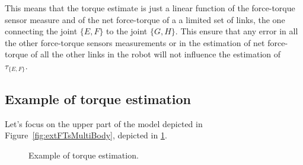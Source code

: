 \begin{remark}
This means that the torque estimate is just a linear function of the force-torque sensor measure and of the net force-torque of a a limited set of links, the one connecting the joint $\{ E,F \}$ to the joint $\{ G, H \}$. This ensure that any error in all the other force-torque sensors measurements or in the estimation of net force-torque of all the other links in the robot will not influence the estimation of $\tau_{\{E,F\}}$. 
\end{remark}

\subsection{Example of torque estimation}
Let's focus on the upper part of the model depicted in Figure~\ref{fig:extFTsMultiBody}, depicted in \ref{fig:local-torque-estimation}. 

\begin{figure}
\centering
{}
\caption{Example of torque estimation.}
\label{fig:local-torque-estimation}
\end{figure}


